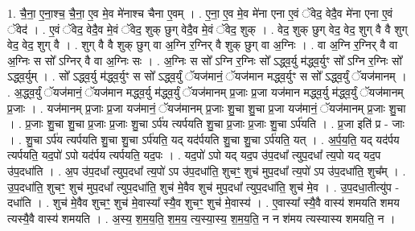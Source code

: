 \documentclass[17pt]{extarticle}
\begin{document}
1. चै॒ना॒ ए॒ना॒श्च॒ चै॒ना॒ ए॒व मे॒व मे॑नाश्च चैना ए॒वम् । . ए॒ना॒ ए॒व मे॒व मे॑ना एना ए॒वं ॅवेद॒ वेदै॒व मे॑ना एना ए॒वं ॅवेद॑ । . ए॒वं ॅवेद॒ वेदै॒व मे॒वं ॅवेद॒ शुक् छुग् वेदै॒व मे॒वं ॅवेद॒ शुक् । . वेद॒ शुक् छुग् वेद॒ वेद॒ शुग् वै वै शुग् वेद॒ वेद॒ शुग् वै । . शुग् वै वै शुक् छुग् वा अ॒ग्नि र॒ग्निर् वै शुक् छुग् वा अ॒ग्निः । . वा अ॒ग्नि र॒ग्निर् वै वा अ॒ग्निः स सो᳚ ऽग्निर् वै वा अ॒ग्निः सः । . अ॒ग्निः स सो᳚ ऽग्नि र॒ग्निः सो᳚ ऽद्ध्व॒र्यु म॑द्ध्व॒र्युꣳ सो᳚ ऽग्नि र॒ग्निः सो᳚ ऽद्ध्व॒र्युम् । . सो᳚ ऽद्ध्व॒र्यु म॑द्ध्व॒र्युꣳ स सो᳚ ऽद्ध्व॒र्युं ॅयज॑मानं॒ ॅयज॑मान मद्ध्व॒र्युꣳ स सो᳚ ऽद्ध्व॒र्युं ॅयज॑मानम् । . अ॒द्ध्व॒र्युं ॅयज॑मानं॒ ॅयज॑मान मद्ध्व॒र्यु म॑द्ध्व॒र्युं ॅयज॑मानम् प्र॒जाः प्र॒जा यज॑मान मद्ध्व॒र्यु म॑द्ध्व॒र्युं ॅयज॑मानम् प्र॒जाः । . यज॑मानम् प्र॒जाः प्र॒जा यज॑मानं॒ ॅयज॑मानम् प्र॒जाः शु॒चा शु॒चा प्र॒जा यज॑मानं॒ ॅयज॑मानम् प्र॒जाः शु॒चा । . प्र॒जाः शु॒चा शु॒चा प्र॒जाः प्र॒जाः शु॒चा ऽर्प॑य त्यर्पयति शु॒चा प्र॒जाः प्र॒जाः शु॒चा ऽर्प॑यति । . प्र॒जा इति॑ प्र - जाः । . शु॒चा ऽर्प॑य त्यर्पयति शु॒चा शु॒चा ऽर्प॑यति॒ यद् यद॑र्पयति शु॒चा शु॒चा ऽर्प॑यति॒ यत् । . अ॒र्प॒य॒ति॒ यद् यद॑र्पय त्यर्पयति॒ यद॒पो॑ ऽपो यद॑र्पय त्यर्पयति॒ यद॒पः । . यद॒पो॑ ऽपो यद् यद॒प उ॑प॒दधा᳚ त्युप॒दधा᳚ त्य॒पो यद् यद॒प उ॑प॒दधा॑ति । . अ॒प उ॑प॒दधा᳚ त्युप॒दधा᳚ त्य॒पो॑ ऽप उ॑प॒दधा॑ति॒ शुचꣳ॒॒ शुच॑ मुप॒दधा᳚ त्य॒पो॑ ऽप उ॑प॒दधा॑ति॒ शुच᳚म् । . उ॒प॒दधा॑ति॒ शुचꣳ॒॒ शुच॑ मुप॒दधा᳚ त्युप॒दधा॑ति॒ शुच॑ मे॒वैव शुच॑ मुप॒दधा᳚ त्युप॒दधा॑ति॒ शुच॑ मे॒व । . उ॒प॒दधा॒तीत्यु॑प - दधा॑ति । . शुच॑ मे॒वैव शुचꣳ॒॒ शुच॑ मे॒वास्या᳚ स्यै॒व शुचꣳ॒॒ शुच॑ मे॒वास्य॑ । . ए॒वास्या᳚ स्यै॒वै वास्य॑ शमयति शमय त्यस्यै॒वै वास्य॑ शमयति । . अ॒स्य॒ श॒म॒य॒ति॒ श॒म॒य॒ त्य॒स्या॒स्य॒ श॒म॒य॒ति॒ न न श॑मय त्यस्यास्य शमयति॒ न । \newline
\end{document}
